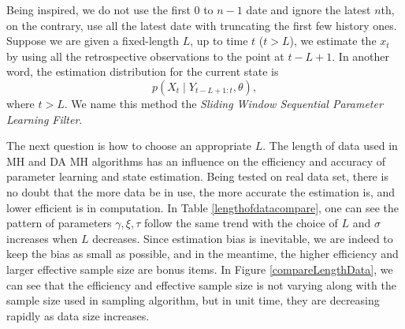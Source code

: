 Being inspired, we do not use the first $0$ to $n-1$ date and ignore the latest $n$th, on the contrary, use all the latest date with truncating the first few history ones. Suppose we are given a fixed-length $L$, up to time $t$ ($t>L$),  we estimate the $x_t$ by using all the retrospective observations to the point at $t-L+1$. In another word, the estimation distribution for the current state is 
\begin{equation}
p(X_{t}\mid Y_{t-L+1:t},\theta),
\end{equation}
where $t>L$. We name this method the \textit{Sliding Window Sequential Parameter Learning Filter}. 

The next question is how to choose an appropriate $L$. The length of data used in MH and DA MH algorithms has an influence on the efficiency and accuracy of parameter learning and state estimation. Being tested on real data set, there is no doubt that the more data be in use, the more accurate the estimation is, and lower efficient is in computation. In Table \ref{lengthofdatacompare}, one can see the pattern of parameters $\gamma,\xi,\tau$ follow the same trend with the choice of $L$ and $\sigma$ increases when $L$ decreases. Since estimation bias is inevitable, we are indeed to keep the bias as small as possible, and in the meantime, the higher efficiency and larger effective sample size are bonus items. In Figure \ref{compareLengthData}, we can see that the efficiency and effective sample size is not varying along with the sample size used in sampling algorithm, but in unit time, they are decreasing rapidly as data size increases. 
